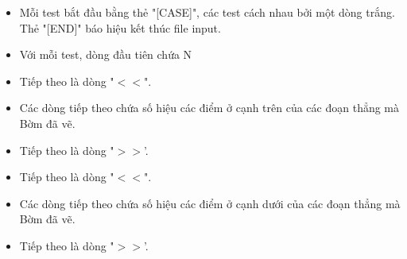 \begin{itemize}
	\item     Mỗi test bắt đầu bằng thẻ "[CASE]", các test cách nhau bởi một dòng trắng. Thẻ "[END]" báo hiệu kết thúc file input.   
	\item     Với mỗi test, dòng đầu tiên chứa N   
	\item     Tiếp theo là dòng "$<$$<$".   
	\item     Các dòng tiếp theo chứa số hiệu các điểm ở cạnh trên của các đoạn thẳng mà Bờm đã vẽ.   
	\item     Tiếp theo là dòng "$>$$>$'.   
	\item     Tiếp theo là dòng "$<$$<$".   
	\item     Các dòng tiếp theo chứa số hiệu các điểm ở cạnh dưới của các đoạn thẳng mà Bờm đã vẽ.   
	\item     Tiếp theo là dòng "$>$$>$'.   
\end{itemize}